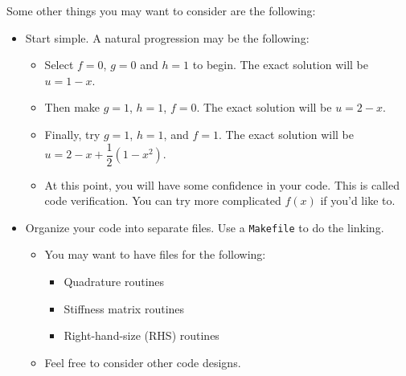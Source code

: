 \documentclass[11pt]{article}
\newcommand{\lr}[1]{\left(#1\right)}
\begin{document}
  Some other things you may want to consider are the following:
  \begin{itemize}
    \item Start simple.  A natural progression may be the following:
      \begin{itemize}
        \item Select $f = 0$, $g = 0$ and $h = 1$ to begin.  The exact solution will be $u = 1 - x$.
        \item Then make $g = 1$, $h = 1$, $f = 0$.  The exact solution will be $u = 2 - x$.
        \item Finally, try $g = 1$, $h = 1$, and $f = 1$.  The exact solution will be $u = 2 - x + \dfrac{1}{2}\lr{1 -
x^{2}}$.
        \item At this point, you will have some confidence in your code.  This is called code verification.  You can try more
complicated $f\lr{x}$ if you'd like to.
      \end{itemize}
    \item Organize your code into separate files.  Use a \texttt{Makefile} to do the linking.
      \begin{itemize}
        \item You may want to have files for the following:
          \begin{itemize}
            \item Quadrature routines 
            \item Stiffness matrix routines 
            \item Right-hand-size (RHS) routines
          \end{itemize}
        \item Feel free to consider other code designs.
      \end{itemize}
  \end{itemize}
  
\end{document}

